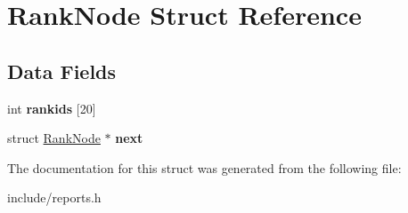 \hypertarget{struct_rank_node}{}\section{Rank\+Node Struct Reference}
\label{struct_rank_node}
\subsection*{Data Fields}
\begin{DoxyCompactItemize}
\item 
\mbox{\label{struct_rank_node_ace2aba3cae9ab3c83c32aae0ab75e8d7}} 
int {\bfseries rankids} \mbox{[}20\mbox{]}
\item 
\mbox{\label{struct_rank_node_a236b0a38592ebd2115bd73eca8d13ba9}} 
struct \mbox{\hyperlink{struct_rank_node}{Rank\+Node}} $\ast$ {\bfseries next}
\end{DoxyCompactItemize}


The documentation for this struct was generated from the following file\+:\begin{DoxyCompactItemize}
\item 
include/reports.\+h\end{DoxyCompactItemize}
